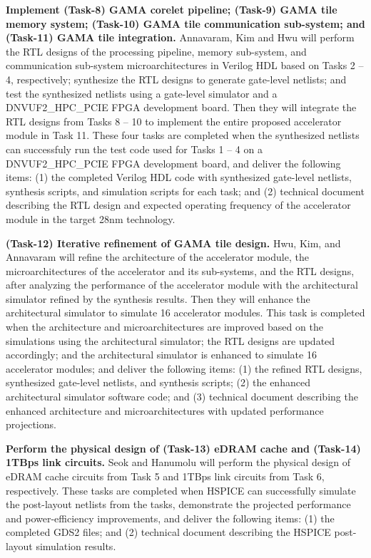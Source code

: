 \vspace{3pt}
\noindent
\textbf{Implement (Task-8) GAMA corelet pipeline; (Task-9) GAMA tile memory system; (Task-10) GAMA tile communication sub-system; and (Task-11) GAMA tile integration.}
 Annavaram, Kim and Hwu will perform the RTL designs of the processing pipeline, memory sub-system, and communication sub-system microarchitectures in Verilog HDL based on Tasks 2 -- 4, respectively; synthesize the RTL designs to generate gate-level netlists; and test the synthesized netlists using a gate-level simulator and a DNVUF2\_HPC\_PCIE FPGA development board.  
Then they will integrate the RTL designs from Tasks 8 -- 10 to implement the entire proposed accelerator module in Task 11. 
These four tasks are completed when the synthesized netlists can successfuly run the test code used for Tasks 1 -- 4 on a DNVUF2\_HPC\_PCIE FPGA development board, and deliver the following items:
(1) the completed Verilog HDL code with synthesized gate-level netlists, synthesis scripts, and simulation scripts for each task; and 
(2) technical document describing the RTL design and expected operating frequency of the accelerator module in the target 28nm technology.


\vspace{3pt}
\noindent
\textbf{(Task-12) Iterative refinement of GAMA tile design.} 
Hwu, Kim, and Annavaram will refine the architecture of the accelerator module, the microarchitectures of the accelerator and its sub-systems, and the RTL designs, after analyzing the performance of the accelerator module with the architectural simulator refined by the synthesis results.
Then they will enhance the architectural simulator to simulate 16 accelerator modules.
This task is completed when 
the architecture and microarchitectures are improved based on the simulations using the architectural simulator; 
the RTL designs are updated accordingly; and
the architectural simulator is enhanced to simulate 16 accelerator modules; and 
deliver the following items:
(1) the refined RTL designs, synthesized gate-level netlists, and synthesis scripts; 
(2) the enhanced architectural simulator software code; and
(3) technical document describing the enhanced architecture and microarchitectures with updated performance projections.


\vspace{3pt}
\noindent
\textbf{Perform the physical design of (Task-13) eDRAM cache and (Task-14)  1TBps link circuits.} 
Seok and Hanumolu will perform the physical design of eDRAM cache circuits from Task 5 and 1TBps link circuits from Task 6, respectively.
These tasks are completed when HSPICE can successfully simulate the post-layout netlists from the tasks, demonstrate the projected performance and power-efficiency improvements, and deliver the following items:
(1) the completed GDS2 files; and (2) technical document describing the HSPICE post-layout simulation results.


